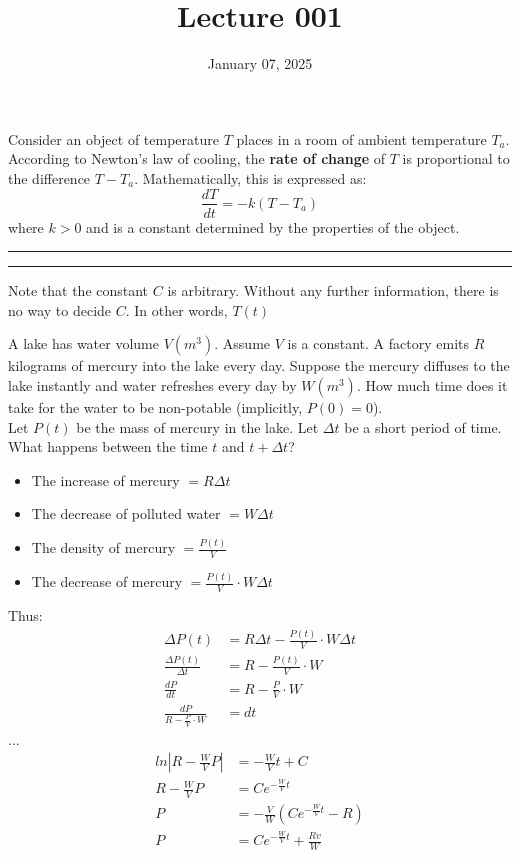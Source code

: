 \documentclass[12pt]{article}
\title{Lecture 001}
\date{January 07, 2025}
\begin{document}
\begin{example}
  Consider an object of temperature $T$ places in a room of ambient temperature $T_a$. According to Newton's law of cooling, the \textbf{rate of change} of $T$ is proportional to the difference $T-T_a$. Mathematically, this is expressed as:
  \begin{equation*}
    \frac{dT}{dt}=-k(T-T_a)
  \end{equation*}
  where $k>0$ and is a constant determined by the properties of the object.

  \vspace{12pt}
  \hrule
  \vspace{12pt}



  \vspace{12pt}
  \hrule
  \vspace{12pt}

  Note that the constant $C$ is arbitrary. Without any further information, there is no way to decide $C$. In other words, $T(t)$
\end{example}

\begin{example}
  A lake has water volume $V (m^3)$. Assume $V$ is a constant. A factory emits $R$ kilograms of mercury into the lake every day. Suppose the mercury diffuses to the lake instantly and water refreshes every day by $W (m^3)$. How much time does it take for the water to be non-potable (implicitly, $P(0) = 0$). \\

  Let $P(t)$ be the mass of mercury in the lake. Let $\Delta t$ be a short period of time. \\

  What happens between the time $t$ and $t+\Delta t$?
  \begin{itemize}
    \itemsep0em
    \item The increase of mercury $= R \Delta t$
    \item The decrease of polluted water $= W \Delta t$
    \item The density of mercury $= \frac{P(t)}{V}$
    \item The decrease of mercury $= \frac{P(t)}{V} \cdot W \Delta t$
  \end{itemize}
  Thus:
  \begin{align*}
    \Delta P(t) &= R \Delta t - \frac{P(t)}{V} \cdot W \Delta t \\
    \frac{\Delta P(t)}{\Delta t} &= R - \frac{P(t)}{V} \cdot W \\
    \frac{dP}{dt} &= R - \frac{P}{V} \cdot W \\
    \frac{dP}{R - \frac{P}{V} \cdot W} &= dt
  \end{align*}
  ...
  \begin{align*}
    ln\left|R-\frac{W}{V}P \right| &= -\frac{W}{V}t + C \\
    R-\frac{W}{V}P &= Ce^{-\frac{W}{V}t} \\
    P &= -\frac{V}{W} \left(Ce^{-\frac{W}{V}t} - R\right) \\
    P &= Ce^{-\frac{W}{V}t} + \frac{Rv}{W}
  \end{align*}
\end{example}
\end{document}
